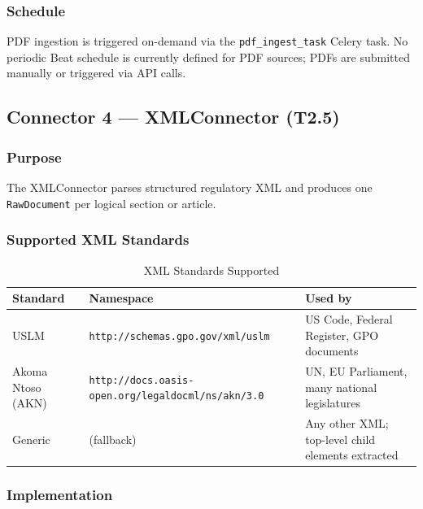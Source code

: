 \documentclass[12pt,a4paper]{article}
\begin{document}
\subsubsection{Schedule}

PDF ingestion is triggered on-demand via the \texttt{pdf\_ingest\_task} Celery task. No periodic Beat schedule is currently defined for PDF sources; PDFs are submitted manually or triggered via API calls.

\subsection{Connector 4 — XMLConnector (T2.5)}

\subsubsection{Purpose}

The XMLConnector parses structured regulatory XML and produces one \texttt{RawDocument} per logical section or article.

\subsubsection{Supported XML Standards}

\begin{table}[H]
\centering
\caption{XML Standards Supported}\label{tab:xmlstds}
\begin{tabularx}{\textwidth}{@{}l l X@{}}
\toprule
\textbf{Standard} & \textbf{Namespace} & \textbf{Used by} \\
\midrule
USLM & \texttt{http://schemas.gpo.gov/xml/uslm} & US Code, Federal Register, GPO documents \\
Akoma Ntoso (AKN) & \texttt{http://docs.oasis-open.org/legaldocml/ns/akn/3.0} & UN, EU Parliament, many national legislatures \\
Generic & (fallback) & Any other XML; top-level child elements extracted \\
\bottomrule
\end{tabularx}
\end{table}

\subsubsection{Implementation}
\end{document}
